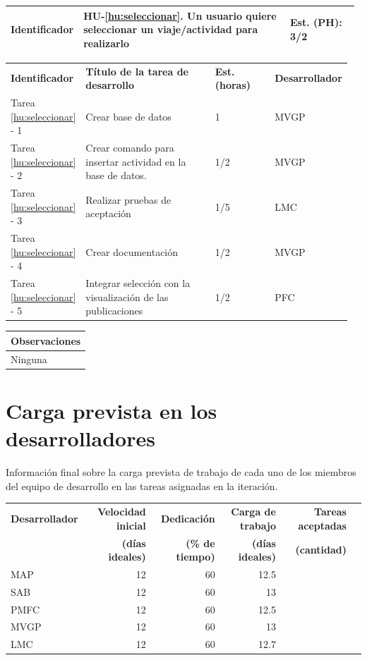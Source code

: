 \documentclass[11pt]{article}
\begin{document}
\begin{longtable}{p{0.18\linewidth}|p{0.6\linewidth}|p{0.2\linewidth}}
  \rowcolor{LightCyan}
  \textbf{Identificador} & \textbf{HU-\ref{hu:seleccionar}}. Un usuario quiere seleccionar un viaje/actividad para realizarlo& \textbf{Est. (PH):} 3/2 \\
  \bottomrule
\end{longtable}
\vspace{-0.5cm}
\begin{longtable}{p{0.18\linewidth}|p{0.4\linewidth}|p{0.18\linewidth}|p{0.2\linewidth}}
  \toprule
  \textbf{Identificador} & \textbf{Título de la tarea de desarrollo} & \textbf{Est. (horas)} & \textbf{Desarrollador} \\
  Tarea \ref{hu:seleccionar} - 1 &  Crear base de datos & 1 & MVGP\\
  Tarea \ref{hu:seleccionar} - 2 & Crear comando para insertar actividad en la base de datos. & 1/2 & MVGP\\
  Tarea \ref{hu:seleccionar} - 3 & Realizar pruebas de aceptación & 1/5 & LMC\\
  Tarea \ref{hu:seleccionar} - 4 & Crear documentación & 1/2 & MVGP\\
  Tarea \ref{hu:seleccionar} - 5 & Integrar selección con la visualización de las publicaciones & 1/2 & PFC\\
  \bottomrule
\end{longtable}
\vspace{-0.5cm}
\begin{longtable}{p{1.028\linewidth}}
  \textbf{Observaciones}\\
  \midrule
  Ninguna\\
  \bottomrule
\end{longtable}


\section{Carga prevista en los desarrolladores}

Información final sobre la carga prevista de trabajo de cada uno de los miembros del equipo de desarrollo en las tareas asignadas en la iteración.

\begin{longtable}{lrrrrr}
  \toprule
  \textbf{Desarrollador} & \textbf{Velocidad inicial} & \textbf{Dedicación} & \textbf{Carga de trabajo} & \textbf{Tareas aceptadas} \\
  & \textbf{(días ideales)} & \textbf{(\% de tiempo)} & \textbf{(días ideales)} & \textbf{ (cantidad)}\\
  \midrule
  MAP & 12 & 60 & 12.5 &\\
  SAB & 12 & 60 & 13 & \\
  PMFC & 12 & 60 & 12.5 &  \\
  MVGP & 12 & 60 & 13\\
  LMC & 12 & 60 & 12.7\\
  \bottomrule
\end{longtable}
\end{document}

